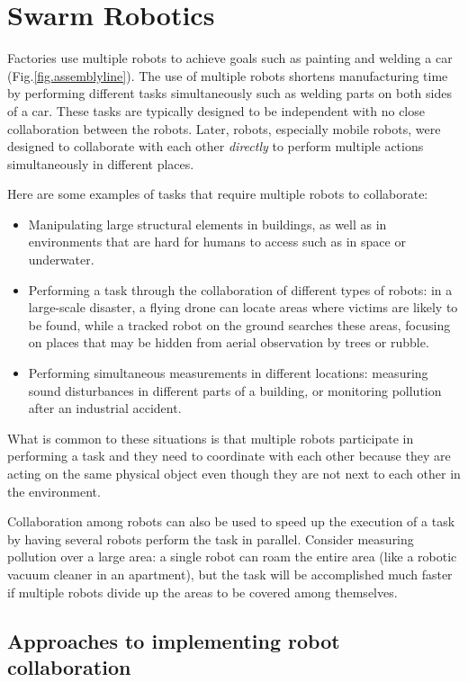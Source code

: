 
\chapter{Swarm Robotics}\label{ch.swarm}

Factories use multiple robots to achieve goals such as painting and welding a car (Fig.\ref{fig.assemblyline}). The use of multiple robots shortens manufacturing time by performing different tasks simultaneously such as welding parts on both sides of a car. These tasks are typically designed to be independent with no close collaboration between the robots. Later, robots, especially mobile robots, were designed to collaborate with each other \emph{directly} to perform multiple actions simultaneously in different places.

Here are some examples of tasks that require multiple robots to collaborate:
\begin{itemize}
\item Manipulating large structural elements in buildings, as well as in environments that are hard for humans to access such as in space or underwater.
\item Performing a task through the collaboration of different types of robots: in a large-scale disaster, a flying drone can locate areas where victims are likely to be found, while a tracked robot on the ground searches these areas, focusing on places that may be hidden from aerial observation by trees or rubble.
\item Performing simultaneous measurements in different locations: measuring sound disturbances in different parts of a building, or monitoring pollution after an industrial accident. 
\end{itemize}
What is common to these situations is that multiple robots participate in performing a task and they need to coordinate with each other because they are acting on the same physical object even though they are not next to each other in the environment. 

Collaboration among robots can also be used to speed up the execution of a task by having several robots perform the task in parallel. Consider measuring pollution over a large area: a single robot can roam the entire area (like a robotic vacuum cleaner in an apartment), but the task will be accomplished much faster if multiple robots divide up the areas to be covered among themselves.

\section{Approaches to implementing robot collaboration}

